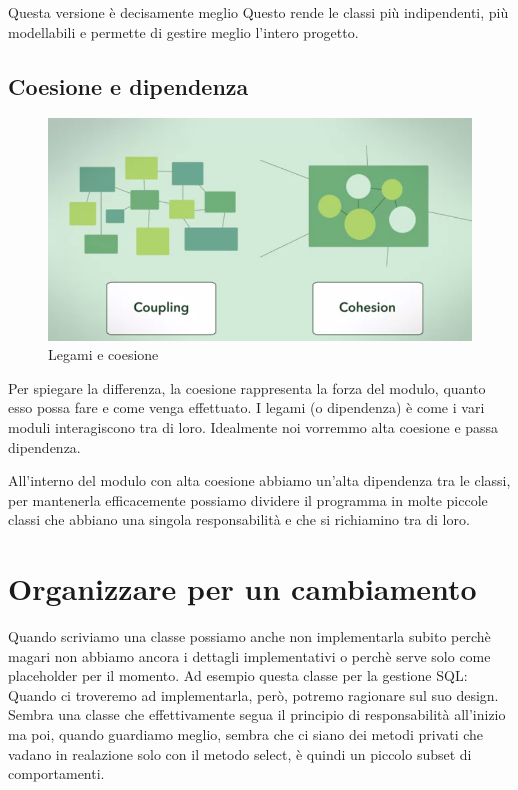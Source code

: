\documentclass[11pt,a4paper]{book}
\begin{document}
Questa versione è decisamente meglio
\label{code: 056}
Questo rende le classi più indipendenti, più modellabili e permette di gestire meglio l'intero progetto.

\subsection{Coesione e dipendenza}
\begin{figure}[h!]
	\begin{center}
		\includegraphics[scale=0.6]{img/002.png}
		\caption{Legami e coesione}
		\label{fig: 002}
	\end{center}
\end{figure}
Per spiegare la differenza, la coesione rappresenta la forza del modulo, quanto esso possa fare e come venga effettuato. I legami (o dipendenza) è come i vari moduli interagiscono tra di loro.
Idealmente noi vorremmo alta coesione e passa dipendenza.

All'interno del modulo con alta coesione abbiamo un'alta dipendenza tra le classi, per mantenerla efficacemente possiamo dividere il programma in molte piccole classi che abbiano una singola responsabilità e che si richiamino tra di loro.

\section{Organizzare per un cambiamento}
Quando scriviamo una classe possiamo anche non implementarla subito perchè magari non abbiamo ancora i dettagli implementativi o perchè serve solo come placeholder per il momento. Ad esempio questa classe per la gestione SQL:
\label{code: 057}
Quando ci troveremo ad implementarla, però, potremo ragionare sul suo design. Sembra una classe che effettivamente segua il principio di responsabilità all'inizio ma poi, quando guardiamo meglio, sembra che ci siano dei metodi privati che vadano in realazione solo con il metodo select, è quindi un piccolo subset di comportamenti.
\end{document}
